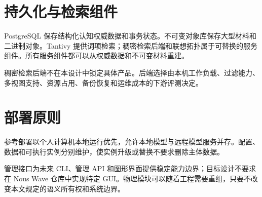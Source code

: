 \section{持久化与检索组件}

PostgreSQL 保存结构化认知权威数据和事务状态。不可变对象库保存大型材料和二进制对象。Tantivy 提供词项检索；稠密检索后端和联想拓扑属于可替换的服务组件。所有服务组件都可以从权威数据和不可变材料重建。

稠密检索后端不在本设计中锁定具体产品。后端选择由本机工作负载、过滤能力、多视图支持、资源占用、备份恢复和运维成本的下游评测决定。

\section{部署原则}

参考部署以个人计算机本地运行优先，允许本地模型与远程模型服务并存。配置、数据和可执行实例分别维护，使实例升级或替换不要求删除主体数据。

管理接口为未来 CLI、管理 API 和图形界面提供稳定能力边界；目标设计不要求在 Nous Wave 仓库中实现特定 GUI。物理模块可以随着工程需要重组，只要不改变本文规定的语义所有权和系统边界。

